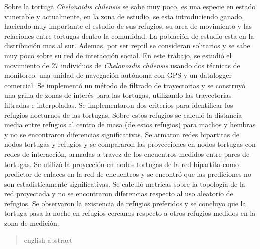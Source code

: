\begin{resumen}%
    Sobre la tortuga \textit{Chelonoidis chilensis} se sabe muy poco, es una especie en estado vunerable  y actualmente, en la zona de estudio, se esta introduciendo ganado, haciendo muy importante el estudio de  sus refugios, su area de movimiento y las relaciones entre tortugas dentro la comunidad. La población de estudio esta en la distribución mas al sur. Ademas, por ser reptil se consideran solitarios y se sabe muy poco sobre su red de interacción social. 
    En este trabajo, se estudió el movimiento de 27 individuos de \textit{Chelonoidis chilensis} usando dos técnicas de monitoreo: una unidad de navegación  autónoma con GPS y un datalogger comercial. Se implementó un método de filtrado de trayectorias y se construyó una grilla de zonas de interés para las tortugas, utilizando las trayectorias filtradas e interpoladas. Se implementaron dos criterios para identificar los refugios nocturnos de las tortugas. Sobre estos refugios se calculó la distancia media entre refugios al centro de masa (de estos refugios) para machos y hembras y no se encontraron diferencias significativas. Se armaron redes bipartitas de nodos tortugas y refugios y se compararon las proyecciones en nodos tortugas con redes de interacción, armadas a travez de los encuentros medidos entre pares de tortugas. Se utilizó la proyección en nodos tortugas de la red bipartita como predictor de enlaces en la red de encuentros y se encontró que las prediciones no son estadistícamente significativas. Se calculó metricas sobre la topología de la red proyectada y no se encontraron diferencias respecto al uso aleatorio de refugios. Se observaron la existencia de refugios preferidos y se concluyo que la tortuga pasa la noche en refugios cercanos respecto a otros refugios medidos en la zona de medición.
\end{resumen}

\begin{abstract}%
english abstract
\end{abstract}


